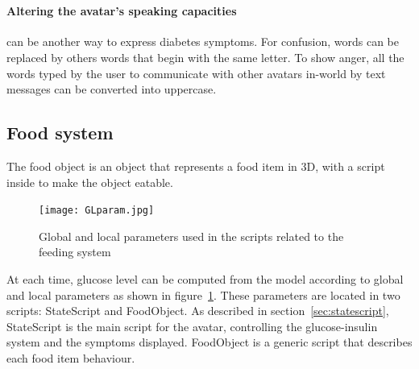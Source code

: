 \\


\paragraph{Altering the avatar's speaking capacities} can be another way to express diabetes symptoms. For confusion, words can be replaced by others words that begin with the same letter. 
To show anger, all the words typed by the user to communicate with other avatars in-world by text messages can be converted into uppercase. 

\subsection{Food system}

The food object is an object that represents a food item in 3D, with a script inside to make the object eatable. 


\begin{figure}[h]
  \caption{Global and local parameters used in the scripts related to the feeding system}
  \centering
  \texttt{[image: GLparam.jpg]}
  \label{fig:GLparam}
\end{figure}

At each time, glucose level can be computed from the model according to global and local parameters as shown in figure~\ref{fig:GLparam}. These parameters are located in two scripts: StateScript and FoodObject. As described in section~\ref{sec:statescript}, StateScript is the main script for the avatar, controlling the glucose-insulin system and the symptoms displayed. FoodObject is a generic script that describes each food item behaviour. 

